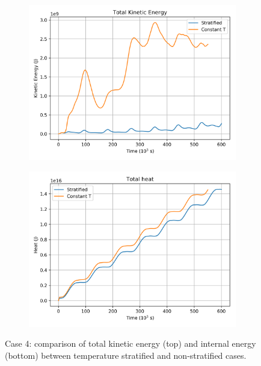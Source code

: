 \documentclass[11pt]{article}
\begin{document}
\begin{figure}[h!]
\centering
\begin{subfigure}{0.48\linewidth}
\includegraphics[width=\linewidth]{periodicForcing/forcing-TKE}
\caption{}
\label{fig:periodicForcingTKE}
\end{subfigure}
\begin{subfigure}{0.48\linewidth}
\includegraphics[width=\linewidth]{periodicForcing/forcing-Q}
\caption{}
\label{fig:periodicForcingQ}
\end{subfigure}
\caption{Case 4: comparison of total kinetic energy (top) and internal energy (bottom) between temperature stratified and non-stratified cases.}
\end{figure}
\end{document}
